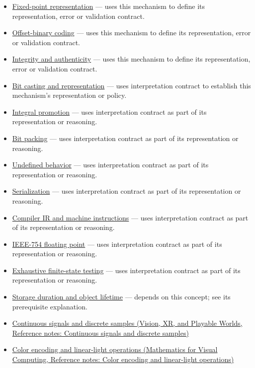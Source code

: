\begin{itemize}
\tightlist
\item
  \hyperref[appendix-1d0dbe8924cc]{Fixed-point representation} --- uses this mechanism to define its representation, error or validation contract.
\item
  \hyperref[appendix-53a8cfb25f8d]{Offset-binary coding} --- uses this mechanism to define its representation, error or validation contract.
\item
  \hyperref[appendix-cbe594d1ab0a]{Integrity and authenticity} --- uses this mechanism to define its representation, error or validation contract.
\item
  \hyperref[appendix-34ee45f161c1]{Bit casting and representation} --- uses interpretation contract to establish this mechanism's representation or policy.
\item
  \hyperref[appendix-45303d03796a]{Integral promotion} --- uses interpretation contract as part of its representation or reasoning.
\item
  \hyperref[appendix-1f9963e1a5d1]{Bit packing} --- uses interpretation contract as part of its representation or reasoning.
\item
  \hyperref[appendix-f558f5b4d8f2]{Undefined behavior} --- uses interpretation contract as part of its representation or reasoning.
\item
  \hyperref[appendix-91d09ebed979]{Serialization} --- uses interpretation contract as part of its representation or reasoning.
\item
  \hyperref[appendix-942ad41afb30]{Compiler IR and machine instructions} --- uses interpretation contract as part of its representation or reasoning.
\item
  \hyperref[appendix-343615f49ddf]{IEEE-754 floating point} --- uses interpretation contract as part of its representation or reasoning.
\item
  \hyperref[appendix-05db24ccc28a]{Exhaustive finite-state testing} --- uses interpretation contract as part of its representation or reasoning.
\item
  \hyperref[appendix-0b104bcba06b]{Storage duration and object lifetime} --- depends on this concept; see its prerequisite explanation.
\item
  \href{../07-Vision-XR-and-Playable-Worlds/main.pdf\#nameddest=appendix-1077ea8fc737}{Continuous signals and discrete samples (Vision, XR, and Playable Worlds, Reference notes: Continuous signals and discrete samples)}
\item
  \href{../02-Mathematics-for-Visual-Computing/main.pdf\#nameddest=appendix-a9f83ad40792}{Color encoding and linear-light operations (Mathematics for Visual Computing, Reference notes: Color encoding and linear-light operations)}
\end{itemize}

